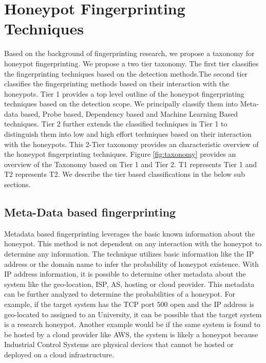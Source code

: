 \section{Honeypot Fingerprinting Techniques}
\label{sec:hft}



Based on the background of fingerprinting research, we propose a taxonomy for honeypot fingerprinting. 
We propose a two tier taxonomy. The first tier classifies the fingerprinting techniques based on the detection methods.The second tier classifies the fingerprinting methods based on their interaction with the honeypots.
Tier 1 provides a top level outline of the honeypot fingerprinting techniques based on the detection scope. We principally classify them into Meta-data based, Probe based, Dependency based and Machine Learning Based techniques. Tier 2 further extends the classified techniques in Tier 1 to distinguish them into low and high effort techniques based on their interaction with the honeypots. This 2-Tier taxonomy provides an characteristic overview of the honeypot fingerprinting techniques. Figure \ref{fig:taxonomy} provides an overview of the Taxonomy based on Tier 1 and Tier 2. T1 represents Tier 1 and T2 represents T2. We describe the tier based classifications in the below sub sections. 


\subsection{Meta-Data based fingerprinting}
Metadata based fingerprinting leverages the basic known information about the honeypot. This method is  not dependent on any interaction with the honeypot to determine any information. The technique utilizes basic information like the IP address or the domain name to infer the probability of honeypot existence. With IP address information, it is possible to determine other metadata about the system like the geo-location, ISP, AS, hosting or cloud provider. This metadata can be further analyzed to determine the probabilities of a honeypot. For example, if the target system has the TCP port 500 open and the IP address is geo-located to assigned to an University, it can be possible that the target system is a research honeypot. Another example would be if the same system is found to be hosted by a cloud provider like AWS, the system is likely a honeypot because Industrial Control Systems are physical devices that cannot be hosted or deployed on a cloud infrastructure.

